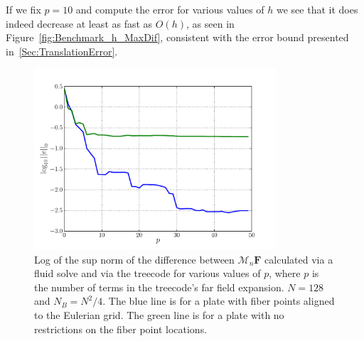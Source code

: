 \documentclass[preprint,12pt]{elsarticle}
\newcommand{\C}[1]{\mathcal{#1}}
\newcommand{\StandardFigureWidth}{3.5375in}%
\begin{document}
If we fix $p=10$ and compute the error for various values of $h$ we see that it does indeed decrease at least as fast as $O(h)$, as seen in Figure~\ref{fig:Benchmark_h_MaxDif}, consistent with the error bound presented in~\ref{Sec:TranslationError}.


\begin{figure}[!b]
	\begin{center}
		\includegraphics[bb=0in 0in 7.7in 6.3in,width=\StandardFigureWidth,clip]{Benchmark_p_MaxDif.pdf}
	\end{center}
	\caption{Log of the sup norm of the difference between $\C{M}_n\mathbf{F}$ calculated via a fluid solve and via the treecode for various values of $p$, where $p$ is the number of terms in the treecode's far field expansion. $N=128$ and $N_B=N^2/4$. The blue line is for a plate with fiber points aligned to the Eulerian grid. The green line is for a plate with no restrictions on the fiber point locations.}
	\label{fig:Benchmark_p_MaxDif}
\end{figure}
\end{document}
